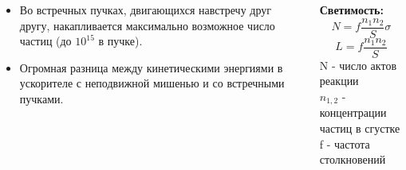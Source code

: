 \documentclass[dvipsnames] {beamer}
\begin{document}
\begin{frame}
\begin{columns}[t]
    \begin{block}{}
      {\scriptsize
      \begin{itemize}
      \item Во встречных пучках, двигающихся навстречу друг другу, накапливается максимально возможное число частиц (до $10^{15}$ в пучке).
      \item Огромная разница между кинетическими энергиями в ускорителе с неподвижной мишенью и со встречными пучками.
      \end{itemize}
      }
    \end{block}
    \begin{block}{\bf \centering Светимость:}
      \begin{equation*}
        N = f \dfrac{n_{1} n_{2}}{S} \sigma
      \end{equation*}
      \begin{equation*}
        L = f \dfrac{n_{1} n_{2}}{S}
      \end{equation*}
      \footnotesize N - число актов реакции \\
      \footnotesize $n_{1, 2}$ - концентрации частиц в сгустке \\
      \footnotesize f - частота столкновений
    \end{block}    
  \end{columns} 
\end{frame}

\begin{frame}
  
\end{frame}

\end{document}
